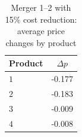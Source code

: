 \begin{table}[H]
\centering
\caption{Merger 1--2 with 15\% cost reduction: average price changes by product}
\begin{tabular}{lc}
\hline Product & $\Delta p$ \\ \hline
$1$ & -0.177 \\
$2$ & -0.183 \\
$3$ & -0.009 \\
$4$ & -0.008 \\
\hline\end{tabular}\end{table}
